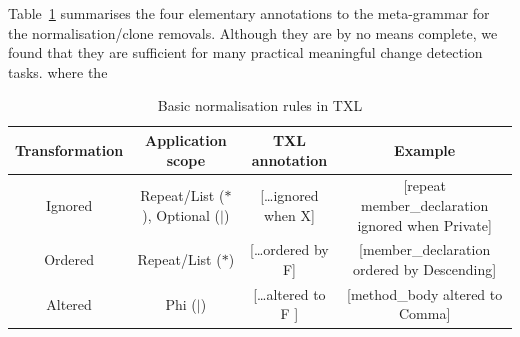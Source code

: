 \documentclass[10pt, conference, compsocconf]{IEEEtran}
\begin{document}
Table~\ref{table:rule} summarises the four elementary annotations to the meta-grammar for the normalisation/clone removals. Although they are by no means complete, we found that they are sufficient for many practical meaningful change detection tasks. where the 
\begin{table}\centering
\caption{Basic normalisation rules in TXL}\label{table:rule}
\begin{tabular}{|c|c|c|c|}\hline
Transformation & Application scope & TXL annotation & Example \\\hline\hline
Ignored & Repeat/List ($*$), Optional ($|$) & [\ldots ignored when X] & [repeat member\_declaration ignored when Private]\\\hline\hline 
Ordered & Repeat/List ($*$) & [\ldots ordered by F] & [member\_declaration ordered by Descending] \\\hline\hline
Altered & Phi ($|$) & [\ldots altered to F ] & [method\_body altered to Comma] \\\hline\hline
\hline\end{tabular}
\end{table}
\end{document}
